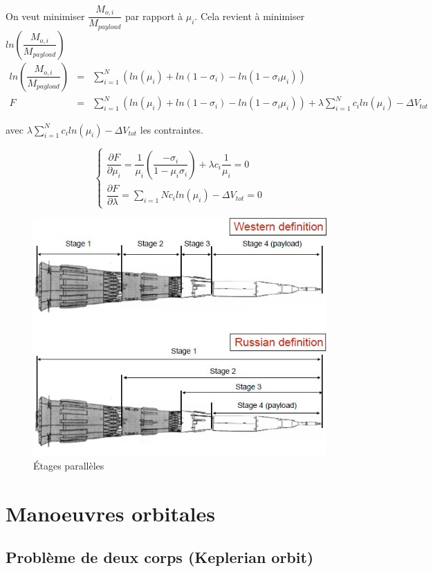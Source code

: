 \documentclass{report}
\begin{document}
On veut minimiser $\dfrac{M_{o,i}}{M_{payload}}$ par rapport à $\mu_i$. Cela revient à minimiser $ln\left(\dfrac{M_{o,i}}{M_{payload}}\right)$
\begin{eqnarray}
ln\left(\dfrac{M_{o,i}}{M_{payload}}\right) &= &\sum_{i=1}^N \left(ln(\mu_i)+ln(1-\sigma_i)-ln(1-\sigma_i\mu_i)\right)\\
F &= &\sum_{i=1}^N \left(ln(\mu_i)+ln(1-\sigma_i)-ln(1-\sigma_i\mu_i)\right) + \lambda\sum_{i=1}^N c_iln(\mu_i)-\Delta V_{tot}
\end{eqnarray}

avec $\lambda\sum_{i=1}^N c_iln(\mu_i)-\Delta V_{tot}$ les contraintes.

\[
\begin{cases}
\dfrac{\partial F}{\partial\mu_i} = \dfrac{1}{\mu_i}\left(\dfrac{-\sigma_i}{1-\mu_i\sigma_i}\right) + \lambda c_i\dfrac{1}{\mu_i}=0\\
\dfrac{\partial F}{\partial\lambda}=\sum_{i=1}{N}c_i ln(\mu_i)-\Delta V_{tot} = 0
\end{cases}
\]

\begin{figure}[h!]
    \centering
    \includegraphics[scale=0.7]{56}
    \caption{Étages parallèles}
    \label{56}
\end{figure}

\section{Manoeuvres orbitales}

\subsection{Problème de deux corps (Keplerian orbit)}
\end{document}
